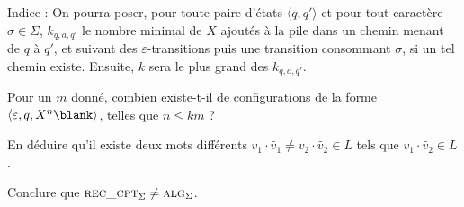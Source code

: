 \begin{exercice}
\begin{questions}
    Indice : On pourra poser, pour toute paire d'états $\langle q, q' \rangle$ et pour tout caractère $\sigma \in \Sigma$,
    $k_{q, a, q'}$ le nombre minimal de $X$ ajoutés à la pile dans un chemin menant de $q$ à $q'$, et suivant des $\varepsilon$-transitions puis
    une transition consommant $\sigma$, si un tel chemin existe. Ensuite, $k$ sera le plus grand des $k_{q, a, q'}$.
  \item Pour un $m$ donné, combien existe-t-il de configurations de la forme $\langle \varepsilon, q, X^n\blank \rangle$, telles que $n \le k m$ ?
  \item En déduire qu'il existe deux mots différents $v_1 \cdot \tilde{v_1} \neq v_2 \cdot \tilde{v_2} \in L$ tels que
    $v_1 \cdot \tilde{v_2} \in L$. 
  \item Conclure que $\textsc{rec\_cpt}_\Sigma \neq \textsc{alg}_\Sigma$.
  \end{questions}
  
\end{exercice}

